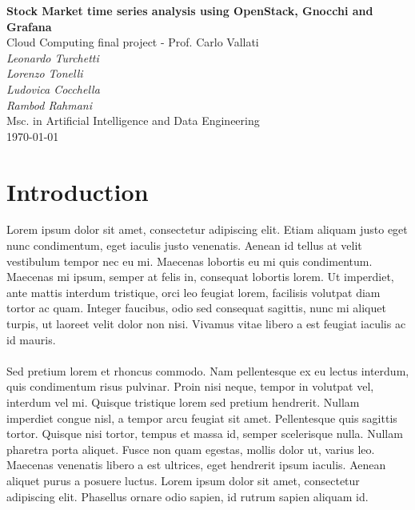 \documentclass[11pt,a4paper]{article}
\begin{document}
\begin{center}
	\Large\textbf{Stock Market time series analysis using OpenStack, Gnocchi and Grafana}\\
	\vspace{0.2cm}
	\large{Cloud Computing final project - Prof. Carlo Vallati}\\
	\vspace{1.0cm}
	\large\textit{Leonardo Turchetti}\\
	\large\textit{Lorenzo Tonelli}\\
	\large\textit{Ludovica Cocchella}\\
	\large\textit{Rambod Rahmani}\\
	\vspace{0.2cm}
	\scriptsize{Msc. in Artificial Intelligence and Data Engineering}\\
	\vspace{1.0cm}
	\today
\end{center}
\tableofcontents
\section{Introduction}
Lorem ipsum dolor sit amet, consectetur adipiscing elit. Etiam aliquam justo eget nunc condimentum, eget iaculis justo venenatis. Aenean id tellus at velit vestibulum tempor nec eu mi. Maecenas lobortis eu mi quis condimentum. Maecenas mi ipsum, semper at felis in, consequat lobortis lorem. Ut imperdiet, ante mattis interdum tristique, orci leo feugiat lorem, facilisis volutpat diam tortor ac quam. Integer faucibus, odio sed consequat sagittis, nunc mi aliquet turpis, ut laoreet velit dolor non nisi. Vivamus vitae libero a est feugiat iaculis ac id mauris.\\
\\
Sed pretium lorem et rhoncus commodo. Nam pellentesque ex eu lectus interdum, quis condimentum risus pulvinar. Proin nisi neque, tempor in volutpat vel, interdum vel mi. Quisque tristique lorem sed pretium hendrerit. Nullam imperdiet congue nisl, a tempor arcu feugiat sit amet. Pellentesque quis sagittis tortor. Quisque nisi tortor, tempus et massa id, semper scelerisque nulla. Nullam pharetra porta aliquet. Fusce non quam egestas, mollis dolor ut, varius leo. Maecenas venenatis libero a est ultrices, eget hendrerit ipsum iaculis. Aenean aliquet purus a posuere luctus. Lorem ipsum dolor sit amet, consectetur adipiscing elit. Phasellus ornare odio sapien, id rutrum sapien aliquam id.
\end{document}
